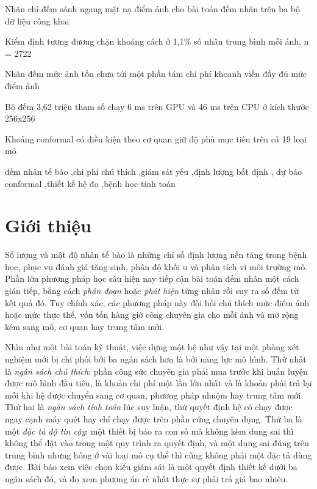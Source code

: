 \documentclass[preprint,12pt]{elsarticle}
\begin{document}
\begin{frontmatter}
\begin{highlights}
\item Nhãn chỉ-đếm sánh ngang mặt nạ điểm ảnh cho bài toán đếm nhân trên ba bộ dữ liệu công khai
\item Kiểm định tương đương chặn khoảng cách ở 1,1\% số nhân trung bình mỗi ảnh, n = 2722
\item Nhãn đếm mức ảnh tốn chưa tới một phần tám chi phí khoanh viền đầy đủ mức điểm ảnh
\item Bộ đếm 3,62 triệu tham số chạy 6 ms trên GPU và 46 ms trên CPU ở kích thước 256x256
\item Khoảng conformal có điều kiện theo cơ quan giữ độ phủ mục tiêu trên cả 19 loại mô
\end{highlights}

\begin{keyword}
đếm nhân tế bào \sep chi phí chú thích \sep giám sát yếu \sep định lượng bất định \sep
dự báo conformal \sep thiết kế hệ đo \sep bệnh học tính toán
\end{keyword}

\end{frontmatter}

\section{Giới thiệu}\label{sec:intro}

Số lượng và mật độ nhân tế bào là những chỉ số định lượng nền tảng trong bệnh học, phục vụ đánh giá tăng sinh,
phân độ khối u và phân tích vi môi trường mô. Phần lớn phương pháp học sâu hiện nay tiếp cận bài toán đếm nhân
một cách gián tiếp, bằng cách \emph{phân đoạn} hoặc \emph{phát hiện} từng nhân rồi suy ra số đếm từ kết quả đó.
Tuy chính xác, các phương pháp này đòi hỏi chú thích mức điểm ảnh hoặc mức thực thể, vốn tốn hàng giờ công chuyên
gia cho mỗi ảnh và mở rộng kém sang mô, cơ quan hay trung tâm mới.

Nhìn như một bài toán kỹ thuật, việc dựng một hệ như vậy tại một phòng xét nghiệm mới bị chi phối bởi ba ngân sách
hơn là bởi năng lực mô hình. Thứ nhất là \emph{ngân sách chú thích}: phần công sức chuyên gia phải mua trước khi
huấn luyện được mô hình đầu tiên, là khoản chi phí một lần lớn nhất và là khoản phải trả lại mỗi khi hệ được
chuyển sang cơ quan, phương pháp nhuộm hay trung tâm mới. Thứ hai là \emph{ngân sách tính toán} lúc suy luận, thứ
quyết định hệ có chạy được ngay cạnh máy quét hay chỉ chạy được trên phần cứng chuyên dụng. Thứ ba là một
\emph{đặc tả độ tin cậy}: một thiết bị báo ra con số mà không kèm dung sai thì không thể đặt vào trong một quy
trình ra quyết định, và một dung sai đúng trên trung bình nhưng hỏng ở vài loại mô cụ thể thì cũng không phải một
đặc tả dùng được. Bài báo xem việc chọn kiểu giám sát là một quyết định thiết kế dưới ba ngân sách đó, và đo xem
phương án rẻ nhất thực sự phải trả giá bao nhiêu.
\end{document}
